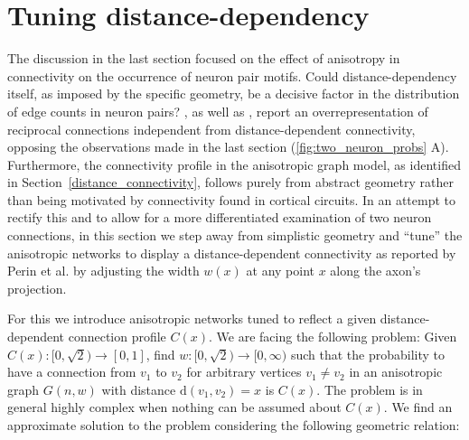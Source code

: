 \newpage
\section{Tuning distance-dependency}

The discussion in the last section focused on the effect of anisotropy
in connectivity on the occurrence of neuron pair motifs. Could
distance-dependency itself, as imposed by the specific geometry, be a
decisive factor in the distribution of edge counts in neuron pairs?
\textcite{Song2005}, as well as \textcite{Perin2011}, report an
overrepresentation of reciprocal connections independent from
distance-dependent connectivity, opposing the observations made in the
last section (\autoref{fig:two_neuron_probs} A). Furthermore, the
connectivity profile in the anisotropic graph model, as identified in
Section~\ref{distance_connectivity}, follows purely from abstract
geometry rather than being motivated by connectivity found in cortical
circuits. In an attempt to rectify this and to allow for a more
differentiated examination of two neuron connections, in this section
we step away from simplistic geometry and \enquote{tune} the
anisotropic networks to display a distance-dependent connectivity as
reported by Perin et al. by adjusting the width $w(x)$ at any point
$x$ along the axon's projection.









For this we introduce anisotropic networks tuned to reflect a given
distance-dependent connection profile $C(x)$. We are facing the
following problem: Given $C(x):[0,\sqrt{2}) \to [0,1]$, find
$w:[0,\sqrt{2}) \to [0,\infty)$ such that the probability to have a
connection from $v_1$ to $v_2$ for arbitrary vertices $v_1 \neq v_2$
in an anisotropic graph $G(n,w)$ with distance $\mathrm{d}(v_1,v_2) =
x$ is $C(x)$. The problem is in general highly complex when nothing
can be assumed about $C(x)$. We find an approximate solution to the
problem considering the following geometric relation:

